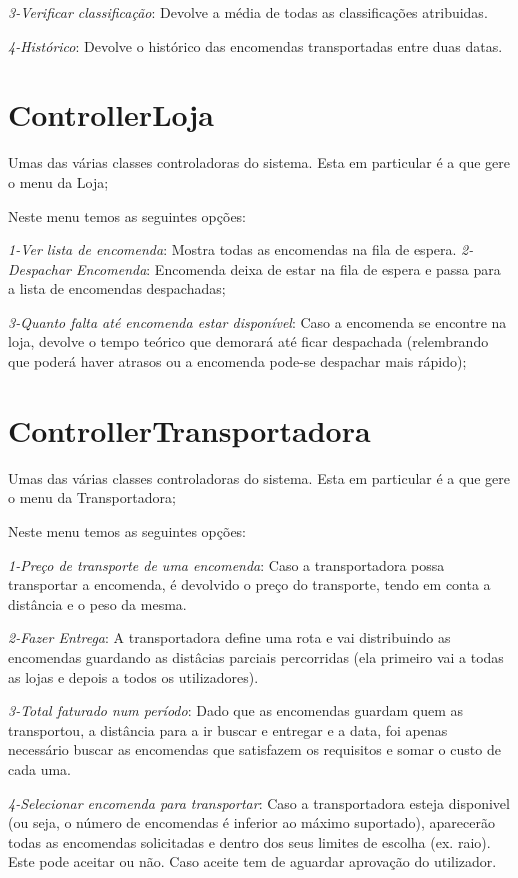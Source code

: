 \documentclass[a4paper]{report}
\begin{document}
	   \textit{3-Verificar classificação}: Devolve a média de todas as classificações atribuidas.
	   
	   \textit{4-Histórico}: Devolve o histórico das encomendas transportadas entre duas datas.
	   

	\section{ControllerLoja}
	 Umas das várias classes controladoras do sistema. Esta em particular é a que gere o menu da Loja;
	 
	 Neste menu temos as seguintes opções:
	 
	 \textit{1-Ver lista de encomenda}: Mostra todas as encomendas na fila de espera.
	 \textit{2-Despachar Encomenda}: Encomenda deixa de estar na fila de espera e passa para a lista de encomendas despachadas;
	 
	 \textit{3-Quanto falta até encomenda estar disponível}: Caso a encomenda se encontre na loja, devolve o tempo teórico que demorará até ficar despachada (relembrando que poderá haver atrasos ou a encomenda pode-se despachar mais rápido);
	
	\section{ControllerTransportadora}
	 Umas das várias classes controladoras do sistema. Esta em particular é a que gere o menu da Transportadora;
	 
	 Neste menu temos as seguintes opções:
	 
	 \textit{1-Preço de transporte de uma encomenda}: Caso a transportadora possa transportar a encomenda, é devolvido o preço do transporte, tendo em conta a distância e o peso da mesma.
	 
	  \textit{2-Fazer Entrega}: A transportadora define uma rota e vai distribuindo as encomendas guardando as distâcias parciais percorridas (ela primeiro vai a todas as lojas e depois a todos os utilizadores).
	  
	  \textit{3-Total faturado num período}: Dado que as encomendas guardam quem as transportou, a distância para a ir buscar e entregar e a data, foi apenas necessário buscar as encomendas que satisfazem os requisitos e somar o custo de cada uma.
	 
	 \textit{4-Selecionar encomenda para transportar}: Caso a transportadora esteja disponivel (ou seja, o número de encomendas é inferior ao máximo suportado), aparecerão todas as encomendas solicitadas e dentro dos seus limites de escolha (ex. raio). Este pode aceitar ou não. Caso aceite tem de aguardar aprovação do utilizador.
	 
\end{document}
